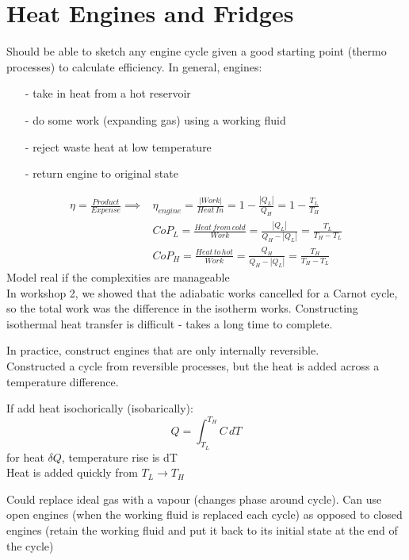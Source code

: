 \documentclass[a4paper, 11pt, normalem]{report}
\begin{document}
\section{Heat Engines and Fridges}
Should be able to sketch any engine cycle given a good starting point (thermo processes) to calculate efficiency. In general, engines:
\begin{itemize}
    \item[-] take in heat from a hot reservoir
    \item[-] do some work (expanding gas) using a working fluid
    \item[-] reject waste heat at low temperature
    \item[-] return engine to original state
\end{itemize}
\begin{align*}
    \eta = \frac{Product}{Expense} \implies& \eta_{engine} = \frac{|Work|}{Heat\,In} = 1 - \frac{|Q_L|}{Q_H} = 1 - \frac{T_L}{T_H} \\
    & CoP_L = \frac{Heat\,from\,cold}{Work} = \frac{|Q_L|}{Q_H - |Q_L|} = \frac{T_L}{T_H - T_L} \\
    & CoP_H = \frac{Heat\,to\,hot}{Work} = \frac{Q_H}{Q_H - |Q_L|} = \frac{T_H}{T_H - T_L}
\end{align*}
Model real if the complexities are manageable \\
In workshop 2, we showed that the adiabatic works cancelled for a Carnot cycle, so the total work was the difference in the isotherm works. Constructing isothermal heat transfer is difficult - takes a long time to complete.

In practice, construct engines that are only internally reversible. \\
Constructed a cycle from reversible processes, but the heat is added across a temperature difference.

If add heat isochorically (isobarically):
\begin{equation*}
    Q = \int_{T_L}^{T_H} C\,dT
\end{equation*}
for heat $\delta Q$, temperature rise is dT \\
Heat is added quickly from $T_L \to T_H$

Could replace ideal gas with a vapour (changes phase around cycle). Can use open engines (when the working fluid is replaced each cycle) as opposed to closed engines (retain the working fluid and put it back to its initial state at the end of the cycle)
\end{document}
